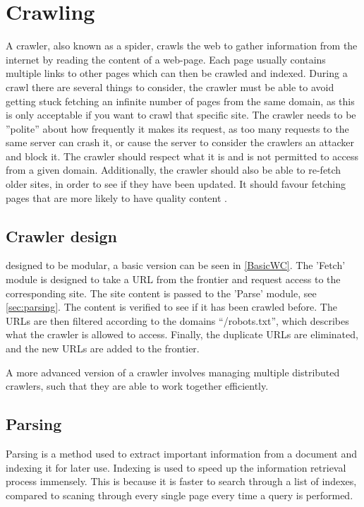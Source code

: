 \chapter{Crawling}

A crawler, also known as a spider, crawls the web to gather information from the
internet by reading the content of a web-page. Each page usually contains
multiple links to other pages which can then be crawled and indexed. During a
crawl there are several things to consider, the crawler must be able to avoid
getting stuck fetching an infinite number of pages from the same domain, as this
is only acceptable if you want to crawl that specific site. The crawler needs to
be ''polite'' about how frequently it makes its request, as too many requests to
the same server can crash it, or cause the server to consider the crawlers an
attacker and block it. The crawler should respect what it is and is not
permitted to access from a given domain. Additionally, the crawler should also
be able to re-fetch older sites, in order to see if they have been updated. It
should favour fetching pages that are more likely to have quality content
\citep[Ch. 20.1]{manning2008introduction}.\nl

\section{Crawler design}%
designed to be modular, a basic version can be seen in \autoref{BasicWC}. The
'Fetch' module is designed to take a URL from the frontier and request access to
the corresponding site. The site content is passed to the 'Parse' module, see
\autoref{sec:parsing}.
The content is verified to see if it has been crawled before. The URLs are then
filtered according to the domains ``/robots.txt'', which describes what the
crawler is allowed to access. Finally, the duplicate URLs are eliminated, and
the new URLs are added to the frontier.


A more advanced version of a crawler involves managing multiple distributed
crawlers, such that they are able to work together efficiently.

\section{Parsing} \label{sec:parsing}
Parsing is a method used to extract important information from a document and
indexing it for later use. Indexing is used to speed up the information
retrieval process immensely. This is because it is faster to search through a
list of indexes, compared to scaning through every single page every time a
query is performed.

